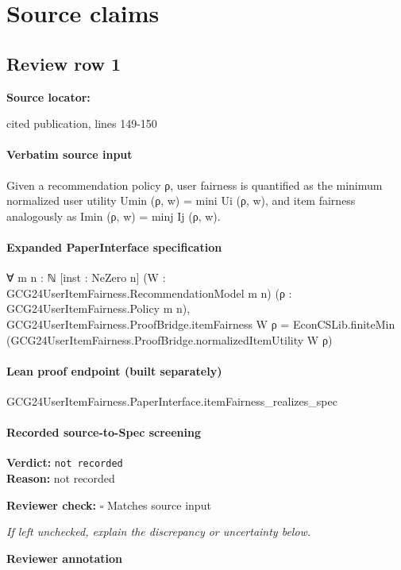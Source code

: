 \documentclass[10pt]{article}
\newcommand{\reviewerbox}{%
  \par\noindent\fbox{\parbox{0.96\linewidth}{\rule{0pt}{0.38in}}}\par
}
\newcommand{\reviewmatch}[1]{%
  \par\noindent\textbf{Reviewer check:} $\square$\; #1\par
  \noindent\emph{If left unchecked, explain the discrepancy or uncertainty below.}\par
}
\begin{document}
\clearpage
\hypertarget{source-claim-9df044aa943faf07}{}
\hypertarget{source-section-f10b5f68e4acf3dc}{}
\section*{Source claims}
\subsection*{Review row 1}
\textbf{Source locator:} {\footnotesize\raggedright cited publication, lines 149-\allowbreak{}150\par}
\paragraph{Verbatim source input}
\begin{ReviewVerbatim}
Given a recommendation policy ρ, user fairness is quantified as the minimum normalized user utility
Umin (ρ, w) = mini Ui (ρ, w), and item fairness analogously as Imin (ρ, w) = minj Ij (ρ, w).
\end{ReviewVerbatim}


\paragraph{Expanded PaperInterface specification}
\begin{ReviewVerbatim}
∀ {m n : ℕ} [inst : NeZero n] (W : GCG24UserItemFairness.RecommendationModel m n)
  (ρ : GCG24UserItemFairness.Policy m n),
  GCG24UserItemFairness.ProofBridge.itemFairness W ρ =
    EconCSLib.finiteMin (GCG24UserItemFairness.ProofBridge.normalizedItemUtility W ρ)
\end{ReviewVerbatim}

\paragraph{Lean proof endpoint (built separately)}\begin{ReviewVerbatim}
GCG24UserItemFairness.PaperInterface.itemFairness_realizes_spec
\end{ReviewVerbatim}

\paragraph{Recorded source-to-Spec screening}
\textbf{Verdict:} \texttt{not recorded}
\\
\textbf{Reason:} not recorded
\reviewmatch{Matches source input}
\noindent\textbf{Reviewer annotation}\par
\reviewerbox
\clearpage
\hypertarget{source-claim-0efedb08b89098c8}{}
\end{document}
